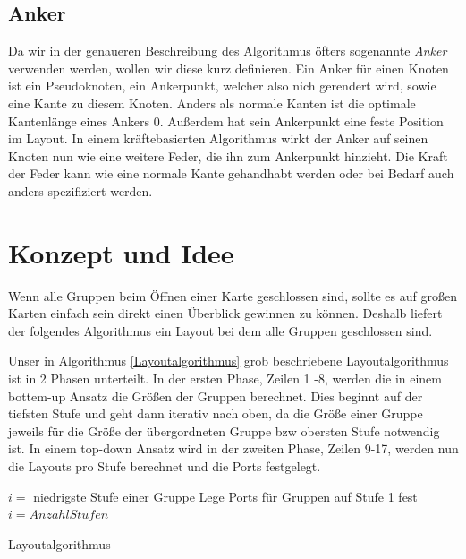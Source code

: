 \subsection*{Anker}
Da wir in der genaueren Beschreibung des Algorithmus öfters sogenannte \textit{Anker} verwenden werden, wollen wir diese kurz definieren. 
Ein Anker für einen Knoten ist ein Pseudoknoten, ein Ankerpunkt, welcher also nich gerendert wird, sowie eine Kante zu diesem Knoten. 
Anders als normale Kanten ist die optimale Kantenlänge eines Ankers  0. Außerdem hat sein Ankerpunkt  eine feste Position im Layout. 
In einem kräftebasierten Algorithmus wirkt der Anker auf seinen Knoten nun wie eine weitere Feder, die ihn zum Ankerpunkt hinzieht.
Die Kraft der Feder kann wie eine normale Kante gehandhabt werden oder bei Bedarf auch anders spezifiziert werden.


\section{Konzept und Idee}
Wenn alle Gruppen beim Öffnen einer Karte geschlossen sind, sollte es auf großen Karten einfach sein direkt einen Überblick gewinnen zu können.
Deshalb liefert der folgendes Algorithmus ein Layout bei dem alle Gruppen geschlossen sind.

Unser in Algorithmus \ref{Layoutalgorithmus} grob beschriebene Layoutalgorithmus ist in 2 Phasen unterteilt. 
In der ersten Phase, Zeilen 1 -8, werden die in einem bottem-up Ansatz die Größen der Gruppen berechnet. 
Dies beginnt auf der tiefsten Stufe und geht dann iterativ nach oben, da die Größe einer Gruppe jeweils für die Größe der übergordneten Gruppe bzw obersten Stufe notwendig ist.
In einem top-down Ansatz wird in der zweiten Phase, Zeilen 9-17, werden nun die Layouts pro Stufe berechnet und die Ports festgelegt. 


\begin{algorithm}[H]
\label{Layoutalgorithmus}
\SetAlgoLined
{} %
$i = $ niedrigste Stufe einer Gruppe \;
Lege Ports für Gruppen auf Stufe 1 fest\;
$i = Anzahl Stufen$\;
\caption{Layoutalgorithmus}
\end{algorithm}


